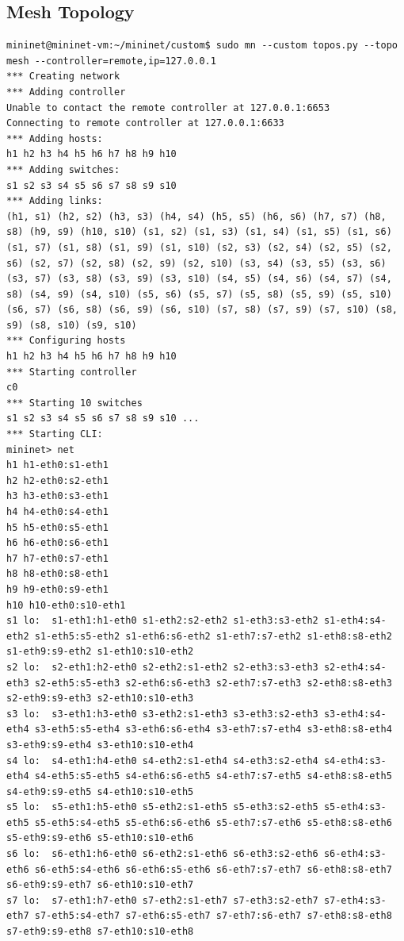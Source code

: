 \documentclass[a4paper, 11pt]{article}
\begin{document}
\begin{appendices}
\subsection{Mesh Topology}
\label{appendix:mesh}
\begin{lstlisting}[style=BashInputStyle]
mininet@mininet-vm:~/mininet/custom$ sudo mn --custom topos.py --topo mesh --controller=remote,ip=127.0.0.1
*** Creating network
*** Adding controller
Unable to contact the remote controller at 127.0.0.1:6653
Connecting to remote controller at 127.0.0.1:6633
*** Adding hosts:
h1 h2 h3 h4 h5 h6 h7 h8 h9 h10
*** Adding switches:
s1 s2 s3 s4 s5 s6 s7 s8 s9 s10
*** Adding links:
(h1, s1) (h2, s2) (h3, s3) (h4, s4) (h5, s5) (h6, s6) (h7, s7) (h8, s8) (h9, s9) (h10, s10) (s1, s2) (s1, s3) (s1, s4) (s1, s5) (s1, s6) (s1, s7) (s1, s8) (s1, s9) (s1, s10) (s2, s3) (s2, s4) (s2, s5) (s2, s6) (s2, s7) (s2, s8) (s2, s9) (s2, s10) (s3, s4) (s3, s5) (s3, s6) (s3, s7) (s3, s8) (s3, s9) (s3, s10) (s4, s5) (s4, s6) (s4, s7) (s4, s8) (s4, s9) (s4, s10) (s5, s6) (s5, s7) (s5, s8) (s5, s9) (s5, s10) (s6, s7) (s6, s8) (s6, s9) (s6, s10) (s7, s8) (s7, s9) (s7, s10) (s8, s9) (s8, s10) (s9, s10)
*** Configuring hosts
h1 h2 h3 h4 h5 h6 h7 h8 h9 h10
*** Starting controller
c0
*** Starting 10 switches
s1 s2 s3 s4 s5 s6 s7 s8 s9 s10 ...
*** Starting CLI:
mininet> net
h1 h1-eth0:s1-eth1
h2 h2-eth0:s2-eth1
h3 h3-eth0:s3-eth1
h4 h4-eth0:s4-eth1
h5 h5-eth0:s5-eth1
h6 h6-eth0:s6-eth1
h7 h7-eth0:s7-eth1
h8 h8-eth0:s8-eth1
h9 h9-eth0:s9-eth1
h10 h10-eth0:s10-eth1
s1 lo:  s1-eth1:h1-eth0 s1-eth2:s2-eth2 s1-eth3:s3-eth2 s1-eth4:s4-eth2 s1-eth5:s5-eth2 s1-eth6:s6-eth2 s1-eth7:s7-eth2 s1-eth8:s8-eth2 s1-eth9:s9-eth2 s1-eth10:s10-eth2
s2 lo:  s2-eth1:h2-eth0 s2-eth2:s1-eth2 s2-eth3:s3-eth3 s2-eth4:s4-eth3 s2-eth5:s5-eth3 s2-eth6:s6-eth3 s2-eth7:s7-eth3 s2-eth8:s8-eth3 s2-eth9:s9-eth3 s2-eth10:s10-eth3
s3 lo:  s3-eth1:h3-eth0 s3-eth2:s1-eth3 s3-eth3:s2-eth3 s3-eth4:s4-eth4 s3-eth5:s5-eth4 s3-eth6:s6-eth4 s3-eth7:s7-eth4 s3-eth8:s8-eth4 s3-eth9:s9-eth4 s3-eth10:s10-eth4
s4 lo:  s4-eth1:h4-eth0 s4-eth2:s1-eth4 s4-eth3:s2-eth4 s4-eth4:s3-eth4 s4-eth5:s5-eth5 s4-eth6:s6-eth5 s4-eth7:s7-eth5 s4-eth8:s8-eth5 s4-eth9:s9-eth5 s4-eth10:s10-eth5
s5 lo:  s5-eth1:h5-eth0 s5-eth2:s1-eth5 s5-eth3:s2-eth5 s5-eth4:s3-eth5 s5-eth5:s4-eth5 s5-eth6:s6-eth6 s5-eth7:s7-eth6 s5-eth8:s8-eth6 s5-eth9:s9-eth6 s5-eth10:s10-eth6
s6 lo:  s6-eth1:h6-eth0 s6-eth2:s1-eth6 s6-eth3:s2-eth6 s6-eth4:s3-eth6 s6-eth5:s4-eth6 s6-eth6:s5-eth6 s6-eth7:s7-eth7 s6-eth8:s8-eth7 s6-eth9:s9-eth7 s6-eth10:s10-eth7
s7 lo:  s7-eth1:h7-eth0 s7-eth2:s1-eth7 s7-eth3:s2-eth7 s7-eth4:s3-eth7 s7-eth5:s4-eth7 s7-eth6:s5-eth7 s7-eth7:s6-eth7 s7-eth8:s8-eth8 s7-eth9:s9-eth8 s7-eth10:s10-eth8

\end{lstlisting}
\end{appendices}
\end{document}
